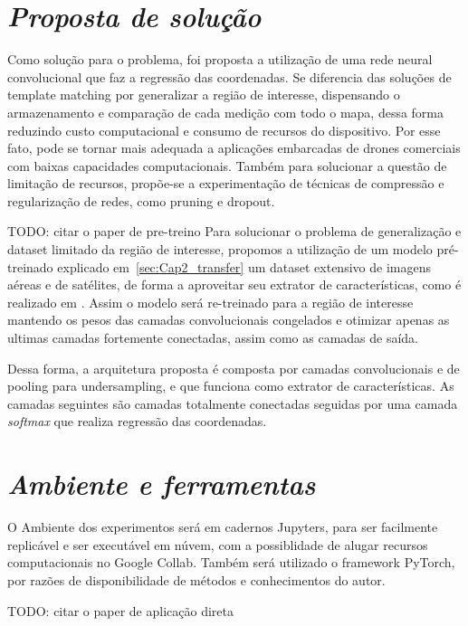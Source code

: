 \section{\textit{Proposta de solução}}\label{sec:Cap3_Proposta}

Como solução para o problema, foi proposta a utilização de uma rede neural convolucional que faz a regressão das coordenadas. Se diferencia das soluções de template matching por generalizar a região de interesse, dispensando o armazenamento e comparação de cada medição com todo o mapa, dessa forma reduzindo custo computacional e consumo de recursos do dispositivo. Por esse fato, pode se tornar mais adequada a aplicações embarcadas de drones comerciais com baixas capacidades computacionais. Também para solucionar a questão de limitação de recursos, propõe-se a experimentação de técnicas de compressão e regularização de redes, como pruning e dropout.

TODO: citar o paper de pre-treino
Para solucionar o problema de generalização e dataset limitado da região de interesse, propomos a utilização de um modelo pré-treinado explicado em~\ref{sec:Cap2_transfer} um dataset extensivo de imagens aéreas e de satélites, de forma a aproveitar seu extrator de características, como é realizado em \cite{Shiguemori2016Embedded}. Assim o modelo será re-treinado para a região de interesse mantendo os pesos das camadas convolucionais congelados e otimizar apenas as ultimas camadas fortemente conectadas, assim como as camadas de saída. 

Dessa forma, a arquitetura proposta é composta por camadas convolucionais e de pooling para undersampling, e que funciona como extrator de características. As camadas seguintes são camadas totalmente conectadas seguidas por uma camada \textit{softmax} que realiza regressão das coordenadas.

\section{\textit{Ambiente e ferramentas}}\label{sec:Cap3_Ferramentas}
O Ambiente dos experimentos será em cadernos Jupyters, para ser facilmente replicável e ser executável em núvem, com a possiblidade de alugar recursos computacionais no Google Collab. Também será utilizado o framework PyTorch, por razões de disponibilidade de métodos e conhecimentos do autor.


TODO: citar o paper de aplicação direta
